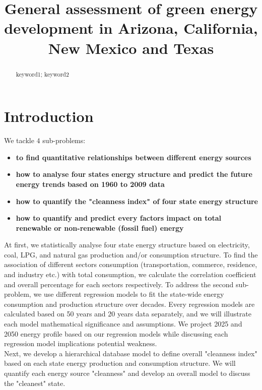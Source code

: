 \documentclass{mcmthesis}
\title{General assessment of green energy development in Arizona, California, New Mexico and Texas}
\begin{document}
\begin{abstract}

\begin{keywords}
keyword1; keyword2
\end{keywords}
\end{abstract}
\maketitle


\section{Introduction}
We tackle $ 4 $ sub-problems:
\begin{itemize}[-]
\item \textbf{to find quantitative relationships between different energy sources}
\item \textbf{how to analyse four states energy structure and predict the future energy trends based on 1960 to 2009 data}
\item \textbf{how to quantify the "cleanness index" of four state energy structure}
\item \textbf{how to quantify and predict every factors impact on total renewable or non-renewable (fossil fuel) energy}
\end{itemize}


At first, we statistically analyse four state energy structure based on electricity, coal, LPG, and natural gas production and/or consumption structure. To find the association of different sectors consumption (transportation, commerce, residence, and industry etc.) with total consumption, we calculate the correlation coefficient and overall percentage for each sectors respectively. 
To address the second sub-problem, we use different regression models to fit the state-wide energy consumption and production structure over decades. Every regression models are calculated based on 50 years and 20 years data separately, and we will illustrate each model mathematical significance and assumptions. We project 2025 and 2050 energy profile based on our regression models while discussing each regression model implications potential weakness.\\

Next, we develop a hierarchical database model to define overall "cleanness index" based on each state energy production and consumption structure. We will quantify each energy source "cleanness" and develop an overall model to discuss the "cleanest" state.\\
\end{document}
